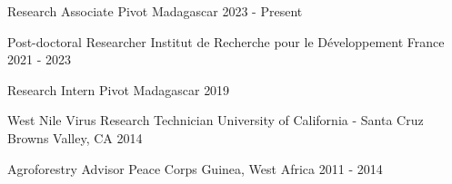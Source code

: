 

\begin{cventries}

      \cventry
    {Research Associate} %
    {Pivot} %
    {Madagascar} %
    {2023 - Present} %
   
   \cventry
    {Post-doctoral Researcher} %
    {Institut de Recherche pour le Développement} %
    {France} %
    {2021 - 2023} %

  \cventry
    {Research Intern} %
    {Pivot} %
    {Madagascar} %
    {2019} %

  \cventry
    {West Nile Virus Research Technician} %
    {University of California - Santa Cruz} %
    {Browns Valley, CA} %
    {2014} %

  \cventry
    {Agroforestry Advisor} %
    {Peace Corps} %
    {Guinea, West Africa} %
    {2011 - 2014} %



\end{cventries}

